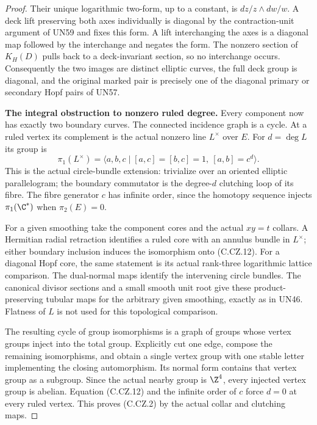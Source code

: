 \begin{proof}
Their unique logarithmic two-form,
up to a constant, is
$dz/z\wedge dw/w$. A deck lift
preserving both axes individually
is diagonal by the contraction-unit
argument of UN59 and fixes this
form. A lift interchanging the axes
is a diagonal map followed by the
interchange and negates the form.
The nonzero section of $K_H(D)$
pulls back to a deck-invariant
section, so no interchange occurs.
Consequently the two images are
distinct elliptic curves, the full
deck group is diagonal, and the
original marked pair is precisely
one of the diagonal primary or
secondary Hopf pairs of UN57.

\par\medskip\noindent\textbf{The integral obstruction to nonzero ruled degree.}
Every component now has exactly two
boundary curves. The connected
incidence graph is a cycle. At a
ruled vertex its complement is the
actual nonzero line $L^\times$ over
$E$. For $d=\deg L$ its group is
\[
 \pi_1(L^\times)=
 \langle a,b,c\mid [a,c]=[b,c]=1,
                               \ [a,b]=c^d\rangle .
\tag{C.CZ.12}
\]
This is the actual circle-bundle
extension: trivialize over an
oriented elliptic parallelogram;
the boundary commutator is the
degree-$d$ clutching loop of its
fibre. The fibre generator $c$
has infinite order, since the
homotopy sequence injects
$\pi_1(\C^*)$ when $\pi_2(E)=0$.

For a given smoothing take the
component cores and the actual
$xy=t$ collars. A Hermitian radial
retraction identifies a ruled
core with an annulus bundle in
$L^\times$; either boundary
inclusion induces the isomorphism
onto (C.CZ.12). For a diagonal
Hopf core, the same statement is
its actual rank-three logarithmic
lattice comparison. The dual-normal
maps identify the intervening
circle bundles. The canonical
divisor sections and a small smooth
unit root give these product-preserving
tubular maps for the arbitrary
given smoothing, exactly as in
UN46. Flatness of $L$ is not used
for this topological comparison.

The resulting cycle of group
isomorphisms is a graph of groups
whose vertex groups inject into
the total group. Explicitly cut
one edge, compose the remaining
isomorphisms, and obtain a single
vertex group with one stable
letter implementing the closing
automorphism. Its normal form
contains that vertex group as
a subgroup. Since the actual
nearby group is $\Z^4$, every
injected vertex group is abelian.
Equation (C.CZ.12) and the
infinite order of $c$ force
$d=0$ at every ruled vertex.
This proves (C.CZ.2) by the
actual collar and clutching maps.


\end{proof}
